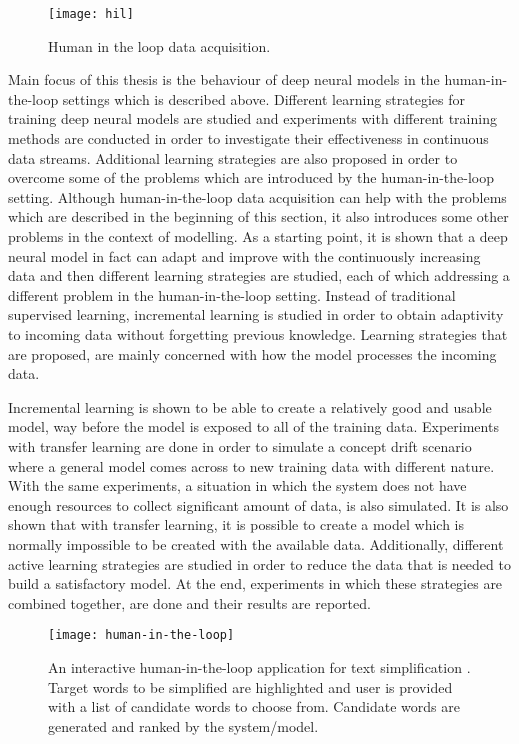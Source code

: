 \begin{figure}[h]
\texttt{[image: hil]}
\centering
\caption{Human in the loop data acquisition.}
\end{figure}

Main focus of this thesis is the behaviour of deep neural models in the human-in-the-loop settings which is described above. Different learning strategies for training deep neural models are studied and experiments with different training methods are conducted in order to investigate their effectiveness in continuous data streams. Additional learning strategies are also proposed in order to overcome some of the problems which are introduced by the human-in-the-loop setting. Although human-in-the-loop data acquisition can help with the problems which are described in the beginning of this section, it also introduces some other problems in the context of modelling. As a starting point, it is shown that a deep neural model in fact can adapt and improve with the continuously increasing data and then different learning strategies are studied, each of which addressing a different problem in the human-in-the-loop setting. Instead of traditional supervised learning, incremental learning is studied in order to obtain adaptivity to incoming data without forgetting previous knowledge. Learning strategies that are proposed, are mainly concerned with how the model processes the incoming data. 

Incremental learning is shown to be able to create a relatively good and usable model, way before the model is exposed to all of the training data. Experiments with transfer learning are done in order to simulate a concept drift scenario where a general model comes across to new training data with different nature. With the same experiments, a situation in which the system does not have enough resources to collect significant amount of data, is also simulated. It is also shown that with transfer learning, it is possible to create a model which is normally impossible to be created with the available data. Additionally, different active learning strategies are studied in order to reduce the data that is needed to build a satisfactory model. At the end, experiments in which these strategies are combined together, are done and their results are reported.

\begin{figure}[h]
\texttt{[image: human-in-the-loop]}
\centering
\caption{An interactive human-in-the-loop application for text simplification \cite{par4sim}. Target words to be simplified are highlighted and user is provided with a list of candidate words to choose from. Candidate words are generated and ranked by the system/model.}
\end{figure}


